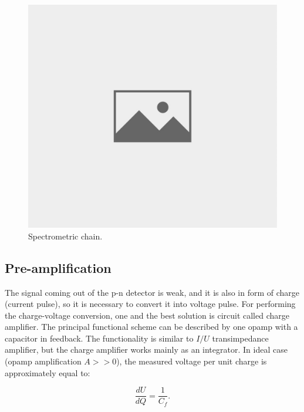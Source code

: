 \begin{figure}[H]
 \centering
 \includegraphics[scale=0.35, angle = 0]{./pictures/NoPicture.jpg}
 \caption{Spectrometric chain.}
 \label{chain}
 
\end{figure}

\subsection{Pre-amplification}
The signal coming out of the p-n detector is weak, and it is also in form of charge (current pulse), so it is necessary to convert it into voltage pulse. For performing the charge-voltage conversion, one and the best solution is circuit called charge amplifier. The principal functional scheme can be described by one opamp with a capacitor in feedback. The functionality is similar to $I/U$ transimpedance amplifier, but the charge amplifier works mainly as an integrator. In ideal case (opamp amplification $A >> 0$), the measured voltage per unit charge is approximately equal to:

\begin{equation}
\frac{dU}{dQ} = \frac{1}{C_{f}}.
\end{equation}


